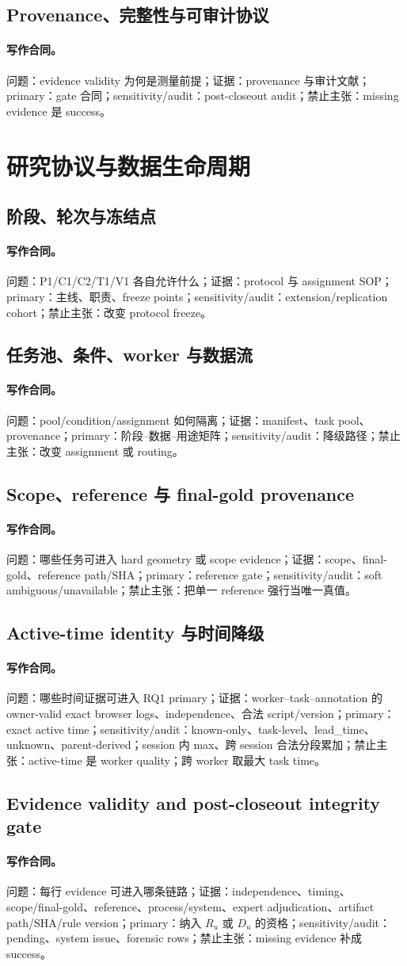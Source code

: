 \documentclass[UTF8,a4paper,12pt]{ctexart}
\newcommand{\contract}[5]{\paragraph{写作合同。}问题：#1；证据：#2；primary：#3；sensitivity/audit：#4；禁止主张：#5。}
\begin{document}
\subsection{Provenance、完整性与可审计协议}
\contract{evidence validity 为何是测量前提}{provenance 与审计文献}{gate 合同}{post-closeout audit}{missing evidence 是 success}

\section{研究协议与数据生命周期}
\subsection{阶段、轮次与冻结点}
\contract{P1/C1/C2/T1/V1 各自允许什么}{protocol 与 assignment SOP}{主线、职责、freeze points}{extension/replication cohort}{改变 protocol freeze}
\subsection{任务池、条件、worker 与数据流}
\contract{pool/condition/assignment 如何隔离}{manifest、task pool、provenance}{阶段--数据--用途矩阵}{降级路径}{改变 assignment 或 routing}
\subsection{Scope、reference 与 final-gold provenance}
\contract{哪些任务可进入 hard geometry 或 scope evidence}{scope、final-gold、reference path/SHA}{reference gate}{soft ambiguous/unavailable}{把单一 reference 强行当唯一真值}
\subsection{Active-time identity 与时间降级}
\contract{哪些时间证据可进入 RQ1 primary}{worker--task--annotation 的 owner-valid exact browser logs、independence、合法 script/version}{exact active time}{known-only、task-level、lead\_time、unknown、parent-derived；session 内 max、跨 session 合法分段累加}{active-time 是 worker quality；跨 worker 取最大 task time}
\subsection{Evidence validity and post-closeout integrity gate}
\contract{每行 evidence 可进入哪条链路}{independence、timing、scope/final-gold、reference、process/system、expert adjudication、artifact path/SHA/rule version}{纳入 $R_u$ 或 $D_u$ 的资格}{pending、system issue、forensic rows}{missing evidence 补成 success}
\end{document}
